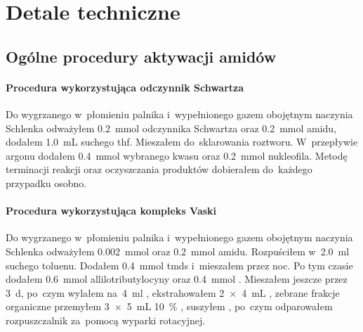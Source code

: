 \chapter{Detale techniczne}\label{chapter:experimental}

\section{Ogólne procedury aktywacji amidów}\label{experimental:activation}
\subsubsection{Procedura wykorzystująca odczynnik Schwartza}\label{experimental:activation:schwartz}
Do wygrzanego w~płomieniu palnika i~wypełnionego gazem obojętnym naczynia Schlenka odważyłem
\SI{0.2}{\mmol} odczynnika Schwartza oraz \SI{0.2}{\mmol} amidu,
  dodałem \SI{1.0}{\mL} suchego \gls{thf}.
Mieszałem do~sklarowania roztworu.
W~przepływie argonu dodałem \SI{0.4}{\mmol} wybranego kwasu oraz \SI{0.2}{\mmol} nukleofila.
Metodę terminacji reakcji oraz oczyszczania produktów dobierałem do~każdego przypadku osobno.

\subsubsection{Procedura wykorzystująca kompleks Vaski}\label{experimental:activation:vaska}
Do wygrzanego w~płomieniu palnika i~wypełnionego gazem obojętnym naczynia Schlenka odważyłem
  \SI{0.002}{\mmol}  oraz \SI{0.2}{\mmol} amidu.
Rozpuściłem w~\SI{2.0}{\ml} suchego toluenu.
Dodałem \SI{0.4}{\mmol} \gls{tmds} i~mieszałem przez noc.
Po tym czasie dodałem \SI{0.6}{\mmol} allilotributylocyny oraz \SI{0.4}{\mmol} .
Mieszałem jeszcze przez \SI{3}{\day}, po~czym wylałem na~\SI{4}{\ml} ,
  ekstrahowałem \SI[product-units = single]{2 x 4}{\mL} , zebrane frakcje organiczne
  przemyłem \SI[product-units = single]{3 x 5}{\mL} \SI{10}{\percent} ,
  suszyłem , po~czym odparowałem rozpuszczalnik za~pomocą wyparki rotacyjnej.

